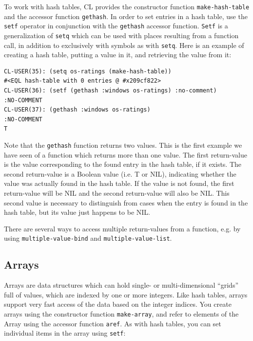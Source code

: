 To work with hash tables, CL provides the constructor function \texttt{make-hash-table} and
the accessor function \texttt{gethash}. In order to set entries in a hash table, use the \texttt{setf} operator
in conjunction with the \texttt{gethash} accessor function. \texttt{Setf} is a generalization of \texttt{setq} which
can be used with places resulting from a function call, in addition to exclusively with
symbols as with \texttt{setq}. Here is an example of creating a hash table, putting a value in it,
and retrieving the value from it:

\begin{verbatim}
CL-USER(35): (setq os-ratings (make-hash-table))
#<EQL hash-table with 0 entries @ #x209cf822>
CL-USER(36): (setf (gethash :windows os-ratings) :no-comment)
:NO-COMMENT
CL-USER(37): (gethash :windows os-ratings)
:NO-COMMENT
T
\end{verbatim}

Note that the \texttt{gethash} function returns two values. This is the first example we have
seen of a function which returns more than one value. The first return-value is the value
corresponding to the found entry in the hash table, if it exists. The second return-value
is a Boolean value (i.e. T or NIL), indicating whether the value was actually found in the
hash table. If the value is not found, the first return-value will be NIL and the second
return-value will also be NIL. This second value is necessary to distinguish from cases when
the entry is found in the hash table, but its value just happens to be NIL.

There are several ways to access multiple return-values from a function, e.g. by using
\texttt{multiple-value-bind} and \texttt{multiple-value-list}.

\subsection{Arrays}

Arrays are data structures which can hold single- or multi-dimensional ``grids'' full of values,
which are indexed by one or more integers. Like hash tables, arrays support very fast access
of the data based on the integer indices. You create arrays using the constructor function
\texttt{make-array}, and refer to elements of the Array using the accessor function \texttt{aref}. As with
hash tables, you can set individual items in the array using \texttt{setf}:

